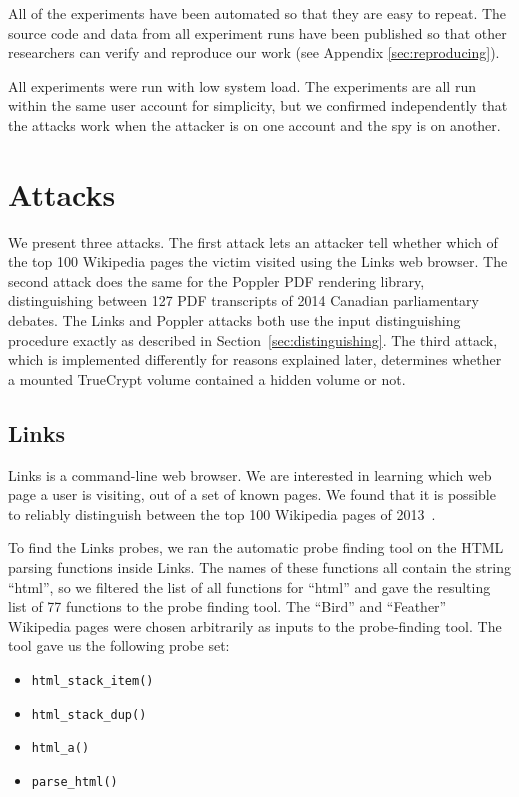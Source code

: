 \documentclass[letterpaper,twocolumn,10pt]{article}
\begin{document}
All of the experiments have been automated so that they are easy to repeat. The
source code and data from all experiment runs have been published so that other
researchers can verify and reproduce our work (see Appendix
\ref{sec:reproducing}).

All experiments were run with low system load. The experiments are all run
within the same user account for simplicity, but we confirmed independently that
the attacks work when the attacker is on one account and the spy is on another.

\section{Attacks}
\label{sec:results}

We present three attacks. The first attack lets an attacker tell whether which
of the top 100 Wikipedia pages the victim visited using the Links web browser.
The second attack does the same for the Poppler PDF rendering library,
distinguishing between 127 PDF transcripts of 2014 Canadian parliamentary
debates. The Links and Poppler attacks both use the input distinguishing
procedure exactly as described in Section~\ref{sec:distinguishing}. The third
attack, which is implemented differently for reasons explained later, determines whether a mounted TrueCrypt
volume contained a hidden volume or not.

\subsection{Links}

Links is a command-line web browser. We are interested in learning which web
page a user is visiting, out of a set of known pages. We found that it is
possible to reliably distinguish between the top 100 Wikipedia pages of
2013~\cite{wikitop2013}.

To find the Links probes, we ran the automatic probe finding tool on the HTML
parsing functions inside Links. The names of these functions all contain the
string ``html'', so we filtered the list of all functions for ``html'' and gave
the resulting list of 77 functions to the probe finding tool.
The ``Bird'' and
``Feather'' Wikipedia pages were chosen arbitrarily as inputs to
the probe-finding tool. The tool gave us the following probe set:

\begin{itemize}
\setlength{\itemsep}{0pt}
    \item \texttt{html\_stack\_item()}
    \item \texttt{html\_stack\_dup()}
    \item \texttt{html\_a()}
    \item \texttt{parse\_html()}
\end{itemize}
\end{document}
